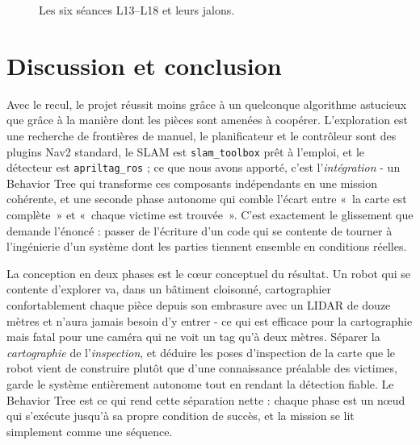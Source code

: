 \documentclass[11pt,a4paper]{article}
\begin{document}
\begin{figure}[htbp]
\centering
{}
\caption{Les six séances L13--L18 et leurs jalons.}
\label{fig:timelineL}
\end{figure}

\section{Discussion et conclusion}
Avec le recul, le projet réussit moins grâce à un quelconque algorithme astucieux que grâce à la manière
dont les pièces sont amenées à coopérer. L'exploration est une recherche de frontières de manuel, le
planificateur et le contrôleur sont des plugins Nav2 standard, le SLAM est \texttt{slam\_toolbox} prêt à
l'emploi, et le détecteur est \texttt{apriltag\_ros} ; ce que nous avons apporté, c'est l'\emph{intégration}
- un Behavior Tree qui transforme ces composants indépendants en une mission cohérente, et une seconde
phase autonome qui comble l'écart entre «~la carte est complète~» et «~chaque victime est trouvée~». C'est
exactement le glissement que demande l'énoncé : passer de l'écriture d'un code qui se contente de tourner
à l'ingénierie d'un système dont les parties tiennent ensemble en conditions réelles.

La conception en deux phases est le cœur conceptuel du résultat. Un robot qui se contente d'explorer va,
dans un bâtiment cloisonné, cartographier confortablement chaque pièce depuis son embrasure avec un LIDAR
de douze mètres et n'aura jamais besoin d'y entrer - ce qui est efficace pour la cartographie mais fatal
pour une caméra qui ne voit un tag qu'à deux mètres. Séparer la \emph{cartographie} de l'\emph{inspection},
et déduire les poses d'inspection de la carte que le robot vient de construire plutôt que d'une connaissance
préalable des victimes, garde le système entièrement autonome tout en rendant la détection fiable. Le
Behavior Tree est ce qui rend cette séparation nette : chaque phase est un nœud qui s'exécute jusqu'à sa
propre condition de succès, et la mission se lit simplement comme une séquence.
\end{document}
